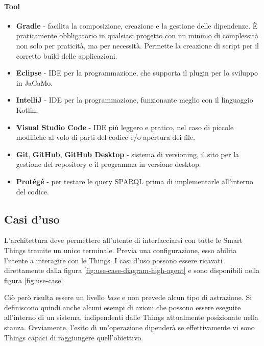 \documentclass[12pt,a4paper,openright,oneside]{report}
\begin{document}
\paragraph{Tool}
\begin{itemize}
	\item \textbf{Gradle} \cite{gradle} - facilita la composizione, creazione e la gestione delle dipendenze. È praticamente obbligatorio in qualsiasi progetto con un minimo di complessità non solo per praticità, ma per necessità. Permette la creazione di script per il corretto build delle applicazioni.
	
	\item \textbf{Eclipse} \cite{eclipse} - IDE per la programmazione, che supporta il plugin per lo sviluppo in JaCaMo.
	
	\item \textbf{IntelliJ} \cite{intellij} - IDE per la programmazione, funzionante meglio con il linguaggio Kotlin.
	
	\item \textbf{Visual Studio Code} \cite{visualstudiocode} - IDE più leggero e pratico, nel caso di piccole modifiche al volo di parti del codice e/o apertura dei file.
	
	\item \textbf{Git}, \textbf{GitHub}, \textbf{GitHub Desktop} \cite{git} - sistema di versioning, il sito per la gestione del repository e il programma in versione desktop.
	
	\item \textbf{Protégé} - per testare le query SPARQL prima di implementarle all'interno del codice.
\end{itemize}

\subsection{Casi d'uso}
L'architettura deve permettere all'utente di interfacciarsi con tutte le Smart Things tramite un unico terminale. Previa una configurazione, esso abilita l'utente a interagire con le Things. I casi d'uso possono essere ricavati direttamente dalla figura \ref{fig:use-case-diagram-high-agent} e sono disponibili nella figura \ref{fig:use-case}

Ciò però risulta essere un livello \textit{base} e non prevede alcun tipo di astrazione. Si definiscono quindi anche alcuni esempi di azioni che possono essere eseguite all'interno di un sistema, indipendenti dalle Things attualmente posizionate nella stanza. Ovviamente, l'esito di un'operazione dipenderà se effettivamente vi sono Things capaci di raggiungere quell'obiettivo.
\end{document}
